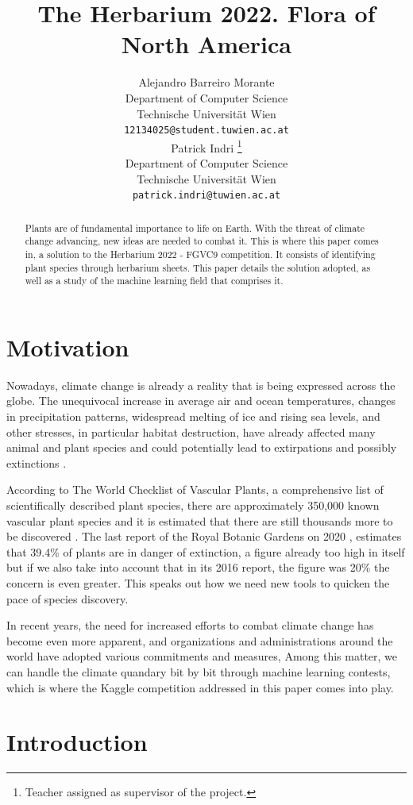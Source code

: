 \documentclass{article}
\title{The Herbarium 2022. Flora of North America}
\author{%
  Alejandro Barreiro Morante \\
  Department of Computer Science\\
  Technische Universität Wien\\
  \texttt{12134025@student.tuwien.ac.at} \\
  \And
  Patrick Indri 
  \thanks{
  Teacher assigned as supervisor of the project. } \\
  Department of Computer Science\\
  Technische Universität Wien\\
  \texttt{patrick.indri@tuwien.ac.at} \\
}
\begin{document}
\maketitle
 \begin{abstract}
Plants are of fundamental importance to life on Earth. With the threat of climate change advancing, new ideas are needed to combat it. This is where this paper comes in, a solution to the Herbarium 2022 - FGVC9 competition. It consists of identifying plant species through herbarium sheets. This paper details the solution adopted, as well as a study of the machine learning field that comprises it. \end{abstract}

\section{Motivation}\label{motivation}

Nowadays, climate change is already a reality that is being expressed across the globe. The unequivocal increase in average air and ocean temperatures, changes in precipitation patterns, widespread melting of ice and rising sea levels, and other stresses, in particular habitat destruction, have already affected many animal and plant species and could potentially lead to extirpations and possibly extinctions \cite{climchang}. 

According to The World Checklist of Vascular Plants, a comprehensive list of scientifically described plant species, there are approximately 350,000 known vascular plant species and it is estimated that there are still thousands more to be discovered \cite{WCVP}. The last report of the Royal Botanic Gardens on 2020 \cite{kew20}, estimates that 39.4\% of plants are in danger of extinction, a figure already too high in itself but if we also take into account that in its 2016 report, the figure was 20\% \cite{kew16}  the concern is even greater. This speaks out how we need new tools to quicken the pace of species discovery.

In recent years, the need for increased efforts to combat climate change has become even more apparent, and organizations and administrations around the world have adopted various commitments and measures, 
Among this matter, we can handle the climate quandary bit by bit through machine learning contests, which is where the Kaggle competition  addressed in this paper comes into play. 

\section{Introduction}
\end{document}
